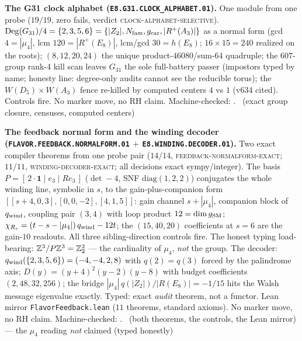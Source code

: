 \par\smallskip\noindent\textbf{The G31 clock alphabet
(\texttt{E8.G31.\allowbreak CLOCK\_ALPHABET.01}).}
One module from one probe ($19/19$, zero fails, verdict
\textsc{clock-alphabet-selective}).
$\mathrm{Deg}(G_{31})/4 = \{2,3,5,6\} = \{|Z_2|, N_{\mathrm{fam}}, g_{\mathrm{car}},
|R^+(A_3)|\}$ as a normal form (gcd $4 = |\mu_4|$, lcm $120 =
|R^+(E_8)|$, lcm/gcd $30 = h(E_8)$; $16 \times 15 = 240$
realized on the roots); $(8,12,20,24)$ the unique
product-$46080$/sum-$64$ quadruple; the $607$-group rank-4 kill
scan leaves $G_{31}$ the sole full-battery passer (impostors
typed by name; honesty line: degree-only audits cannot see the
reducible torus); the $W(D_5)\times W(A_3)$ fence re-killed by
computed centers $4$ vs $1$ (v634 cited).  Controls fire.  No
marker move, no RH claim.
Machine-checked: .
\mE\ (exact group closure, censuses, computed centers)
\par\smallskip

\par\smallskip\noindent\textbf{The feedback normal form and the
winding decoder
(\texttt{FLAVOR.FEEDBACK.\allowbreak NORMALFORM.01} $+$
\texttt{E8.WINDING.\allowbreak DECODER.01}).}
Two exact compiler theorems from one probe pair ($14/14$,
\textsc{feedback-normalform-exact}; $11/11$,
\textsc{winding-decoder-exact}; all decisions exact
sympy/integer).  The basis $P = [\,2\cdot\mathbf 1 \mid e_3 \mid
R e_3\,]$ ($\det -4$, SNF $\mathrm{diag}(1,2,2)$) conjugates the
whole winding line, symbolic in $s$, to the gain-plus-companion
form $[[s{+}4,0,3],[0,0,-2],[4,1,5]]$: gain channel $s +
|\mu_4|$, companion block of $q_{\rm wind}$, coupling pair
$(3,4)$ with loop product $12 = \dim g_{\rm SM}$; $\chi_{R_s} =
(t - s - |\mu_4|)\,q_{\rm wind} - 12t$; the $(15,40,20)$
coefficients at $s = 6$ are the gain-$10$ readouts.  All three
sibling-direction controls fire.  The honest typing
load-bearing: $\mathbb{Z}^3/P\mathbb{Z}^3 = \mathbb{Z}_2^2$ --- the cardinality of
$\mu_4$, \emph{not} the group.  The decoder: $q_{\rm
wind}(\{2,3,5,6\}) = (-4,-4,2,8)$ with $q(2) = q(3)$ forced by
the palindrome axis; $D(y) = (y{+}4)^2(y{-}2)(y{-}8)$ with
budget coefficients $(2, 48, 32, 256)$; the bridge
$|\mu_4|\,q(|Z_2|)/|R(E_8)| = -1/15$ hits the Walsh message
eigenvalue exactly.  Typed: exact \emph{audit} theorem, not a
functor.  Lean mirror \texttt{FlavorFeedback.lean} ($11$
theorems, standard axioms).  No marker move, no RH claim.
Machine-checked: .
\mE\ (both theorems, the controls, the Lean mirror) --- the
$\mu_4$ reading \emph{not} claimed (typed honestly)
\par\smallskip

